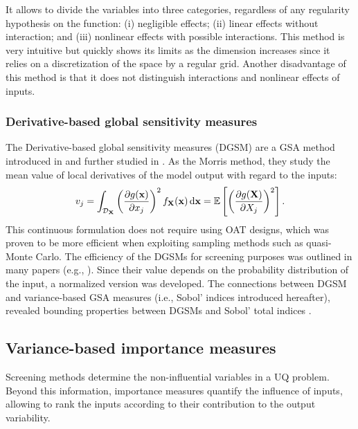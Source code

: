 It allows to divide the variables into three categories, regardless of any regularity hypothesis on the function: 
(i) negligible effects; (ii) linear effects without interaction; and (iii) nonlinear effects with possible interactions. 
This method is very intuitive but quickly shows its limits as the dimension increases since it relies on a discretization of the space by a regular grid. 
Another disadvantage of this method is that it does not distinguish interactions and nonlinear effects of inputs.


\subsubsection{Derivative-based global sensitivity measures}

The Derivative-based global sensitivity measures (DGSM) are a GSA method introduced in \citet{sobol_1995_DGSM} and further studied in \citet{kucherenko_2009_DGSM}. 
As the Morris method, they study the mean value of local derivatives of the model output with regard to the inputs: 
\begin{equation}
    v_j = \int_{\mathcal{D}_{{\bf X}}} \left(\frac{\partial g({\bf x})}{\partial x_j}\right)^2 f_{{\bf X}}({\bf x}) \, \mathrm{d} {\bf x} = \mathbb{E}\left[\left(\frac{\partial g({\bf X})}{\partial X_j}\right)^2\right].
\end{equation}
This continuous formulation does not require using OAT designs, which was proven to be more efficient when exploiting sampling methods such as quasi-Monte Carlo. 
The efficiency of the DGSMs for screening purposes was outlined in many papers (e.g., \citet{kucherenko_iooss_2017}). 
Since their value depends on the probability distribution of the input, a normalized version was developed. 
The connections between DGSM and variance-based GSA measures (i.e., Sobol' indices introduced hereafter), revealed bounding properties between DGSMs and Sobol' total indices \citep{lamboni_iooss_2013_DGSM}.

\subsection{Variance-based importance measures}

Screening methods determine the non-influential variables in a UQ problem. 
Beyond this information, importance measures quantify the influence of inputs, allowing to rank the inputs according to their contribution to the output variability.  

